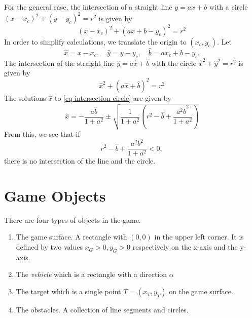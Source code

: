 \documentclass[11pt]{article}
\newcommand{\bhat}{{\hat{b}}}
\newcommand{\xhat}{{\hat{x}}}
\newcommand{\yhat}{{\hat{y}}}
\begin{document}
For the general case, the intersection of a
straight line $y=ax+b$ with a circle $(x-x_c)^2+(y-y_c)^2=r^2$ is given by
\begin{equation}
    (x-x_c)^2 + (ax+b - y_c)^2 = r^2
\end{equation}
In order to simplify calculations, we translate the origin to $(x_c, y_c)$. Let
\begin{equation}
    \xhat = x-x_c,\quad \yhat = y-y_c,\quad \bhat = ax_c + b - y_c.
\end{equation}
The intersection of the straight line $\yhat = a\xhat + \bhat$ with the circle
$\xhat^2 + \yhat^2 = r^2$ is given by
\begin{equation}
    \xhat^2 + (a\xhat + \bhat)^2 = r^2 \label{eq-intersection-circle}
\end{equation}
The solutions $\xhat$ to \eqref{eq-intersection-circle} are given by
\begin{equation}
    \xhat = -\frac{a\bhat}{1+a^2}\pm
        \sqrt{\frac{1}{1+a^2}\left(r^2-\bhat+\frac{a^2 \bhat^2}{1+a^2}\right)}
\end{equation}
From this, we see that if
\begin{equation}
    r^2-\bhat+\frac{a^2 b^2}{1+a^2} < 0,
\end{equation}
there is no intersection of the line and the circle.

\section{Game Objects}
\label{sec-game-objects}
There are four types of objects in the game.
\begin{enumerate}
    \item The game surface. A rectangle with $(0,0)$ in the upper left corner.
        It is defined by two values $x_G > 0, y_G>0$ respectively on the x-axis
        and the y-axis.
    \item The {\sl vehicle} which is a rectangle with a direction $\alpha$
    \item The target which is a single point $T = (x_T, y_T)$ on the game
        surface.
    \item The obstacles. A collection of line segments and circles.
\end{enumerate}
\end{document}
